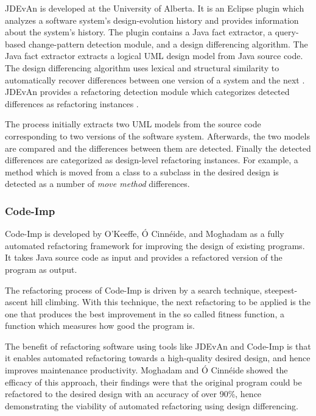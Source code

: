 \documentclass[conference,compsoc,a4paper]{IEEEtran}
\newcommand{\JDEvAn}{\mbox{JDEvAn}\xspace}
\begin{document}
\JDEvAn is developed at the University of Alberta. It is an Eclipse plugin which analyzes a software system's 
design-evolution history and provides information about the system's history. The plugin contains a Java fact 
extractor, a query-based change-pattern detection module, and a design differencing algorithm. The Java fact extractor 
extracts a logical UML design model from Java source code. The design differencing algorithm uses lexical and 
structural similarity to automatically recover differences between one version of a system and the next \cite{Xing2007}.
\JDEvAn provides a refactoring detection module which categorizes detected differences as refactoring instances 
\cite{DBLP:conf/wcre/XingS06}.

The process initially extracts two UML models from the source code corresponding to two versions of the software 
system. Afterwards, the two models are compared and the differences between them are detected. Finally the detected 
differences are categorized as design-level refactoring instances. For example, a method which is moved from a class to 
a subclass in the desired design is detected as a number of \emph{move method} differences.

\subsubsection{Code-Imp}

Code-Imp is developed by O'Keeffe, Ó Cinnéide, and Moghadam \cite{DBLP:journals/jss/OKeeffeC08, 
DBLP:conf/icse/MoghadamC11} as a fully automated refactoring framework for improving the design of existing programs. 
It takes Java source code as input and provides a refactored version of the program as output.

The refactoring process of Code-Imp is driven by a search technique, steepest-ascent hill climbing. With this 
technique, the next refactoring to be applied is the one that produces the best improvement in the so called fitness 
function, a function which measures how good the program is.

The benefit of refactoring software using tools like \JDEvAn and Code-Imp is that it enables automated refactoring 
towards a high-quality desired design, and hence improves maintenance productivity. Moghadam and Ó Cinnéide showed the 
efficacy of this approach, their findings were that the original program could be refactored to the desired design with 
an accuracy of over 90\%, hence demonstrating the viability of automated refactoring using design differencing.
\end{document}
